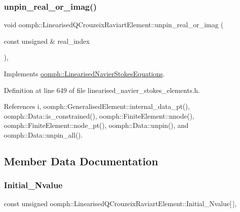 \subsubsection{\texorpdfstring{unpin\+\_\+real\+\_\+or\+\_\+imag()}{unpin\_real\_or\_imag()}}
{\footnotesize\ttfamily void oomph\+::\+Linearised\+Q\+Crouzeix\+Raviart\+Element\+::unpin\+\_\+real\+\_\+or\+\_\+imag (\begin{DoxyParamCaption}\item[{const unsigned \&}]{real\+\_\+index }\end{DoxyParamCaption})\hspace{0.3cm}{\ttfamily [inline]}, {\ttfamily [virtual]}}



Implements \hyperlink{classoomph_1_1LinearisedNavierStokesEquations_ae23ea66f0fd2679658946f790bd53ccd}{oomph\+::\+Linearised\+Navier\+Stokes\+Equations}.



Definition at line 649 of file linearised\+\_\+navier\+\_\+stokes\+\_\+elements.\+h.



References i, oomph\+::\+Generalised\+Element\+::internal\+\_\+data\+\_\+pt(), oomph\+::\+Data\+::is\+\_\+constrained(), oomph\+::\+Finite\+Element\+::nnode(), oomph\+::\+Finite\+Element\+::node\+\_\+pt(), oomph\+::\+Data\+::unpin(), and oomph\+::\+Data\+::unpin\+\_\+all().



\subsection{Member Data Documentation}
\mbox{\label{classoomph_1_1LinearisedQCrouzeixRaviartElement_a0dab34c0ac21f083e33ede23efeae0e0}} 
\subsubsection{\texorpdfstring{Initial\+\_\+\+Nvalue}{Initial\_Nvalue}}
{\footnotesize\ttfamily const unsigned oomph\+::\+Linearised\+Q\+Crouzeix\+Raviart\+Element\+::\+Initial\+\_\+\+Nvalue\mbox{[}$\,$\mbox{]}\hspace{0.3cm}{\ttfamily [static]}, {\ttfamily [private]}}



